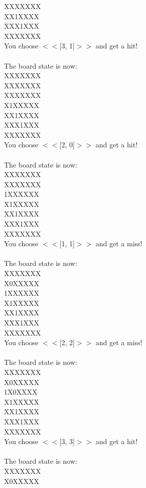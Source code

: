 \documentclass[pdflatex,sn-nature]{sn-jnl}%
\theoremstyle{thmstyleone}%
\theoremstyle{thmstyletwo}%
\theoremstyle{thmstylethree}%
\begin{document}
XXXXXXX $~$\\ 
XX1XXXX $~$\\ 
XXX1XXX $~$\\ 
XXXXXXX $~$\\ 
You choose $<<$[3, 1]$>>$ and get a hit! $~$\\ 
 $~$\\ 
The board state is now: $~$\\ 
XXXXXXX $~$\\ 
XXXXXXX $~$\\ 
XXXXXXX $~$\\ 
X1XXXXX $~$\\ 
XX1XXXX $~$\\ 
XXX1XXX $~$\\ 
XXXXXXX $~$\\ 
You choose $<<$[2, 0]$>>$ and get a hit! $~$\\ 
 $~$\\ 
The board state is now: $~$\\ 
XXXXXXX $~$\\ 
XXXXXXX $~$\\ 
1XXXXXX $~$\\ 
X1XXXXX $~$\\ 
XX1XXXX $~$\\ 
XXX1XXX $~$\\ 
XXXXXXX $~$\\ 
You choose $<<$[1, 1]$>>$ and get a miss! $~$\\ 
 $~$\\ 
The board state is now: $~$\\ 
XXXXXXX $~$\\ 
X0XXXXX $~$\\ 
1XXXXXX $~$\\ 
X1XXXXX $~$\\ 
XX1XXXX $~$\\ 
XXX1XXX $~$\\ 
XXXXXXX $~$\\ 
You choose $<<$[2, 2]$>>$ and get a miss! $~$\\ 
 $~$\\ 
The board state is now: $~$\\ 
XXXXXXX $~$\\ 
X0XXXXX $~$\\ 
1X0XXXX $~$\\ 
X1XXXXX $~$\\ 
XX1XXXX $~$\\ 
XXX1XXX $~$\\ 
XXXXXXX $~$\\ 
You choose $<<$[3, 3]$>>$ and get a hit! $~$\\ 
 $~$\\ 
The board state is now: $~$\\ 
XXXXXXX $~$\\ 
X0XXXXX 
\end{document}
